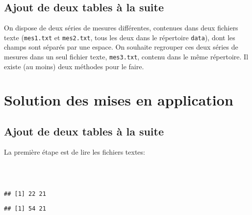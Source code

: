 \subsection{Ajout de deux tables à la suite}

On dispose de deux séries de mesures différentes, contenues dans deux fichiers texte (\texttt{mes1.txt} et \texttt{mes2.txt}, tous les deux dans le répertoire \texttt{data}), dont les champs sont séparés par une espace. On souhaite regrouper ces deux séries de mesures dans un seul fichier texte, \texttt{mes3.txt}, contenu dans le même répertoire. Il existe (au moins) deux méthodes pour le faire.

\clearpage
\section{Solution des mises en application}

\subsection{Ajout de deux tables à la suite}

La première étape est de lire les fichiers textes:

\begin{knitrout}
\color{fgcolor}\begin{kframe}
\begin{flushleft}
\ttfamily\noindent
{}\hlassignement{\usebox{\hlnormalsizeboxlessthan}-}{\ }\hlkeyword{(}\hlkeyword{)}\hspace*{\fill}\\
\hlstd{}\hlassignement{\usebox{\hlnormalsizeboxlessthan}-}{\ }\hlkeyword{(}\hlkeyword{)}\hspace*{\fill}\\
\hlstd{}\hlkeyword{(}\hlkeyword{)}\mbox{}
\normalfont
\end{flushleft}
\begin{verbatim}
## [1] 22 21
\end{verbatim}
\begin{flushleft}
\ttfamily\noindent
{}\hlkeyword{(}\hlkeyword{)}\mbox{}
\normalfont
\end{flushleft}
\begin{verbatim}
## [1] 54 21
\end{verbatim}
\end{kframe}
\end{knitrout}


